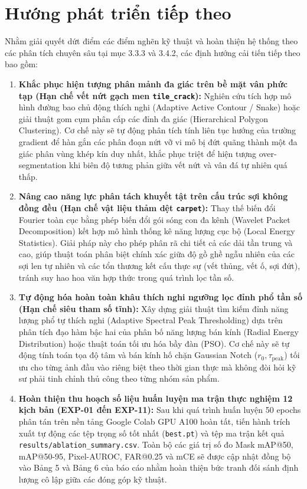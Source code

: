 \section*{Hướng phát triển tiếp theo}

Nhằm giải quyết dứt điểm các điểm nghẽn kỹ thuật và hoàn thiện hệ thống theo các phân tích chuyên sâu tại mục 3.3.3 và 3.4.2, các định hướng cải tiến tiếp theo bao gồm:

\begin{enumerate}
    \item \textbf{Khắc phục hiện tượng phân mảnh đa giác trên bề mặt vân phức tạp (Hạn chế vết nứt gạch men \texttt{tile\_crack}):} Nghiên cứu tích hợp mô hình đường bao chủ động thích nghi (Adaptive Active Contour / Snake) hoặc giải thuật gom cụm phân cấp các đỉnh đa giác (Hierarchical Polygon Clustering). Cơ chế này sẽ tự động phân tích tính liên tục hướng của trường gradient để hàn gắn các phân đoạn nứt vỡ vi mô bị đứt quãng thành một đa giác phân vùng khép kín duy nhất, khắc phục triệt để hiện tượng over-segmentation khi biên độ tương phản giữa vết nứt và vân đá tự nhiên quá thấp.
    \item \textbf{Nâng cao năng lực phân tách khuyết tật trên cấu trúc sợi không đồng đều (Hạn chế vật liệu thảm dệt \texttt{carpet}):} Thay thế biến đổi Fourier toàn cục bằng phép biến đổi gói sóng con đa kênh (Wavelet Packet Decomposition) kết hợp mô hình thống kê năng lượng cục bộ (Local Energy Statistics). Giải pháp này cho phép phân rã chi tiết cả các dải tần trung và cao, giúp thuật toán phân biệt chính xác giữa độ gồ ghề ngẫu nhiên của các sợi len tự nhiên và các tổn thương kết cấu thực sự (vết thủng, vết ố, sợi đứt), tránh suy hao hoa văn hợp thức trong quá trình lọc tần số.
    \item \textbf{Tự động hóa hoàn toàn khâu thích nghi ngưỡng lọc đỉnh phổ tần số (Hạn chế siêu tham số tĩnh):} Xây dựng giải thuật tìm kiếm đỉnh năng lượng phổ tự thích nghi (Adaptive Spectral Peak Thresholding) dựa trên phân tích đạo hàm bậc hai của phân bố năng lượng bán kính (Radial Energy Distribution) hoặc thuật toán tối ưu hóa bầy đàn (PSO). Cơ chế này sẽ tự động tính toán tọa độ tâm và bán kính hố chặn Gaussian Notch ($r_0, \tau_{\text{peak}}$) tối ưu cho từng ảnh đầu vào riêng biệt theo thời gian thực mà không đòi hỏi kỹ sư phải tinh chỉnh thủ công theo từng nhóm sản phẩm.
    \item \textbf{Hoàn thiện thu hoạch số liệu huấn luyện ma trận thực nghiệm 12 kịch bản (EXP-01 đến EXP-11):} Sau khi quá trình huấn luyện 50 epochs phân tán trên nền tảng Google Colab GPU A100 hoàn tất, tiến hành trích xuất tự động các tệp trọng số tốt nhất (\texttt{best.pt}) và tệp ma trận kết quả \texttt{results/ablation\_summary.csv}. Toàn bộ các giá trị số đo Mask mAP@50, mAP@50-95, Pixel-AUROC, FAR@0.25 và mCE sẽ được cập nhật đồng bộ vào Bảng 5 và Bảng 6 của báo cáo nhằm hoàn thiện bức tranh đối sánh định lượng cô lập giữa các đóng góp kỹ thuật.
\end{enumerate}
